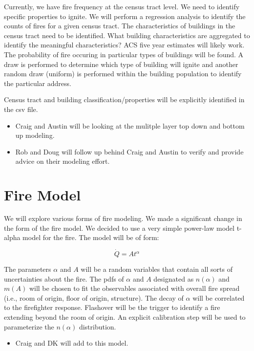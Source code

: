 \documentclass[12pt,oneside]{article}
\begin{document}
Currently, we have fire frequency at the census tract level.  We need to identify specific properties to ignite.  We will perform a regression analysis to identify the counts of fires for a given census tract.  The characteristics of buildings in the census tract need to be identified. What building characteristics are aggregated to identify the meaningful characteristics?  ACS five year estimates will likely work.  The probability of fire occuring in particular types of buildings will be found.  A draw is performed to determine which type of building will ignite and another random draw (uniform) is performed within the building population to identify the particular address.  

Census tract and building classification/properties will be explicitly identified in the csv file.  

\begin{itemize}
\item Craig and Austin will be looking at the mulitple layer top down and bottom up modeling.
\item Rob and Doug will follow up behind Craig and Austin to verify and provide advice on their modeling effort.
\end{itemize}

\section{Fire Model}

We will explore various forms of fire modeling. We made a significant change in the form of the fire model.  We decided to use a very simple power-law model  t-alpha model for the fire.  The model will be of form:

\begin{equation}
\dot{Q}=At^{\alpha}
\label{eq_qdot}
\end{equation} 

The parameters $\alpha$  and $A$  will be a random variables that contain all sorts of uncertainties about the fire. The pdfs of $\alpha$ and $A$ designated as $n(\alpha)$ and $m(A)$ will be chosen to fit the observables associated with overall fire spread (i.e., room of origin, floor of origin, structure).    The decay of $\alpha$ will be correlated to the firefighter response.  Flashover will be the trigger to identify a fire extending beyond the room of origin.  An explicit calibration step will be used to parameterize the $n(\alpha)$ distribution.

\begin{itemize}
\item Craig and DK will add to this model.
\end{itemize}
\end{document}
